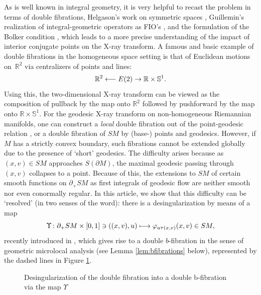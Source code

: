 \documentclass[JEP,XML,SOM,Unicode,NoFloatCountersInSection, NoEqCountersInSection,published]{cedram}
\let\ts\textstyle
\def\mto{\mathchoice{\longmapsto}{\mapsto}{\mapsto}{\mapsto}}
\def\from{\mathchoice{\longleftarrow}{\leftarrow}{\leftarrow}{\leftarrow}}
\theoremstyle{plain}
\theoremstyle{definition}
\theoremstyle{remark}
\def\Sm{\mathbb{S}}
\def\Rm{{\mathbb{R}}}
\newcommand{\del}{\partial}
\newcommand{\foot}{{\pi_{\mathrm f}}}
\begin{document}
As is well known in integral geometry, it is very helpful to recast the problem in terms of double fibrations, \cf Helgason's work
on symmetric spaces \cite{Helgason2010}, Guillemin's realization of integral-geometric operators as FIO's \cite{Guillemin1979}, and
the formulation of the Bolker condition \cite{Monard2013b,Holman2015}, which leads to a more precise understanding of the impact
of interior conjugate points on the X-ray transform. A famous and basic example of double fibrations in the homogeneous space setting
is that of Euclidean motions on~$\Rm^2$ via centralizers of points and lines:
\begin{equation*}
\Rm^2 \from E(2) \to \Rm\times\Sm^1.
\end{equation*}
Using this, the two-dimensional X-ray transform can be viewed as the composition of pullback by the map onto $\Rm^2$ followed by
pushforward by the map onto $\Rm \times \Sm^1$. For the geodesic X-ray transform on non-homogeneous Riemannian manifolds,
one can construct a {\em local} double fibration out of the point-geodesic relation \cite{Monard2013b,Gelfand1969}, or a double fibration
of $SM$ by (base-) points and geodesics. However, if $M$ has a strictly convex boundary, such fibrations cannot be extended globally
due to the presence of `short' geodesics. The difficulty arises because as $(x,v)\in SM$ approaches $S(\partial M)$, the maximal geodesic
passing through $(x,v)$ collapses to a point. Because of this, the extensions to $SM$ of certain smooth functions on $\del_+ SM$
as first integrals of geodesic flow are neither smooth nor even conormally regular. In this article, we show that this difficulty
can be `resolved' (in two senses of the word): there is a desingularization by means of a map
\begin{equation}
\Upsilon \colon \partial_+ SM\times [0,1]\ni ((x,v) ,u) \mto \varphi_{u\tau(x,v)}(x,v) \in SM,
\label{eq:Upsilon}
\end{equation}
recently introduced in \cite{Monard2020a}, which gives rise to a double $b$-fibration in the sense of geometric microlocal
analysis \cite{Melrose1992,Grieser2001} (see Lemma \ref{lem:bfibrations} below), represented by the dashed lines in
Figure \ref{fig:doublefib}.
\begin{figure}[htpb]
\centering
{}
\caption{Desingularization of the double fibration into a double b-fibration via the map $\Upsilon$}
\label{fig:doublefib}
\end{figure}
\end{document}
